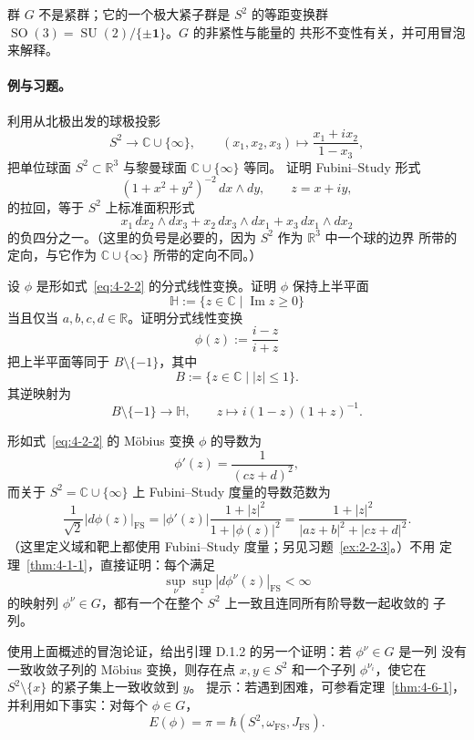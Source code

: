 群 $G$ 不是紧群；它的一个极大紧子群是 $S^2$ 的等距变换群
$\operatorname{SO}(3)=\operatorname{SU}(2)/\{\pm\mathbf1\}$。$G$ 的非紧性与能量的
共形不变性有关，并可用冒泡来解释。

\paragraph{例与习题。}

\begin{exercise}\label{ex:4-2-1}
利用从北极出发的球极投影
\[
  S^2\longrightarrow\mathbb C\cup\{\infty\},
  \qquad
  (x_1,x_2,x_3)\longmapsto\frac{x_1+ix_2}{1-x_3},
\]
把单位球面 $S^2\subset\mathbb R^3$ 与黎曼球面 $\mathbb C\cup\{\infty\}$ 等同。
证明 Fubini--Study 形式
\[
  (1+x^2+y^2)^{-2}\,dx\wedge dy,
  \qquad z=x+iy,
\]
的拉回，等于 $S^2$ 上标准面积形式
\[
  x_1\,dx_2\wedge dx_3+x_2\,dx_3\wedge dx_1+x_3\,dx_1\wedge dx_2
\]
的负四分之一。（这里的负号是必要的，因为 $S^2$ 作为 $\mathbb R^3$ 中一个球的边界
所带的定向，与它作为 $\mathbb C\cup\{\infty\}$ 所带的定向不同。）
\end{exercise}

\begin{exercise}\label{ex:4-2-2}
设 $\phi$ 是形如式~\eqref{eq:4-2-2} 的分式线性变换。证明 $\phi$ 保持上半平面
\[
  \mathbb H:=\{z\in\mathbb C\mid\operatorname{Im}z\ge0\}
\]
当且仅当 $a,b,c,d\in\mathbb R$。证明分式线性变换
\[
  \phi(z):=\frac{i-z}{i+z}
\]
把上半平面等同于 $B\setminus\{-1\}$，其中
\[
  B:=\{z\in\mathbb C\mid |z|\le1\}.
\]
其逆映射为
\[
  B\setminus\{-1\}\longrightarrow\mathbb H,
  \qquad z\longmapsto i(1-z)(1+z)^{-1}.
\]
\end{exercise}

\begin{exercise}\label{ex:4-2-3}
形如式~\eqref{eq:4-2-2} 的 Möbius 变换 $\phi$ 的导数为
\[
  \phi'(z)=\frac1{(cz+d)^2},
\]
而关于 $S^2=\mathbb C\cup\{\infty\}$ 上 Fubini--Study 度量的导数范数为
\[
  \frac1{\sqrt2}|d\phi(z)|_{\mathrm{FS}}
  =|\phi'(z)|\frac{1+|z|^2}{1+|\phi(z)|^2}
  =\frac{1+|z|^2}{|az+b|^2+|cz+d|^2}.
\]
（这里定义域和靶上都使用 Fubini--Study 度量；另见习题~\ref{ex:2-2-3}。）不用
定理~\ref{thm:4-1-1}，直接证明：每个满足
\[
  \sup_\nu\sup_z|d\phi^\nu(z)|_{\mathrm{FS}}<\infty
\]
的映射列 $\phi^\nu\in G$，都有一个在整个 $S^2$ 上一致且连同所有阶导数一起收敛的
子列。
\end{exercise}

\begin{exercise}\label{ex:4-2-4}
使用上面概述的冒泡论证，给出引理 D.1.2 的另一个证明：若 $\phi^\nu\in G$ 是一列
没有一致收敛子列的 Möbius 变换，则存在点 $x,y\in S^2$ 和一个子列
$\phi^{\nu_i}$，使它在 $S^2\setminus\{x\}$ 的紧子集上一致收敛到 $y$。
提示：若遇到困难，可参看定理~\ref{thm:4-6-1}，并利用如下事实：对每个
$\phi\in G$，
\[
  E(\phi)=\pi=\hbar(S^2,\omega_{\mathrm{FS}},J_{\mathrm{FS}}).
\]
\end{exercise}


